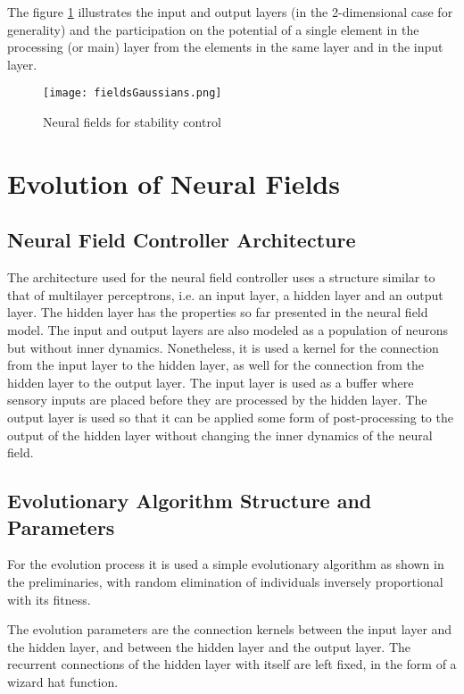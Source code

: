 The figure \ref{fig:nf-controller} illustrates the input and output
layers (in the 2-dimensional case for generality) and the
participation on the potential of a single element in the processing
(or main) layer from the elements in the same layer and in the input
layer.

\begin{figure}[t]
  \centering
  \texttt{[image: fieldsGaussians.png]}
  \caption{Neural fields for stability control}
  \label{fig:nf-controller}
\end{figure}


\section{Evolution of Neural Fields}
\subsection{Neural Field Controller Architecture}
The architecture used for the neural field controller uses a structure
similar to that of multilayer perceptrons, i.e. an input layer, a
hidden layer and an output layer. The hidden layer has the properties
so far presented in the neural field model. The input and output
layers are also modeled as a population of neurons but without inner
dynamics. Nonetheless, it is used a kernel for the connection from the
input layer to the hidden layer, as well for the connection from the
hidden layer to the output layer. The input layer is used as a buffer
where sensory inputs are placed before they are processed by the
hidden layer. The output layer is used so that it can be applied some
form of post-processing to the output of the hidden layer without
changing the inner dynamics of the neural field.

\subsection{Evolutionary Algorithm Structure and Parameters}
For the evolution process it is used a simple evolutionary algorithm
as shown in the preliminaries, with random elimination of individuals
inversely proportional with its fitness.


The evolution parameters are the connection kernels between the input
layer and the hidden layer, and between the hidden layer and the
output layer. The recurrent connections of the hidden layer with
itself are left fixed, in the form of a wizard hat function.

